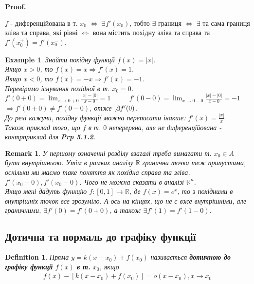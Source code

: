 \documentclass[a4paper, 14pt]{article}
\makeatletter
\def\qed{$\blacksquare$}
\theoremstyle{theoremdd}
\theoremstyle{theoremdd}
\newtheorem{definition}[theorem]{Definition}
\theoremstyle{theoremdd}
\theoremstyle{theoremdd}
\newtheorem{example}[theorem]{Example}
\theoremstyle{theoremdd}
\theoremstyle{theoremdd}
\newtheorem{remark}[theorem]{Remark}
\theoremstyle{theoremdd}
\theoremstyle{theoremdd}
\renewenvironment{proof}[1][Proof.\\]{\par
\pushQED{\hfill \qed}%
\normalfont \topsep6\p@\@plus6\p@\relax
\trivlist
\item\relax
{\bfseries
#1\@addpunct{.}}\hspace\labelsep\ignorespaces
}{%
\popQED\endtrivlist\@endpefalse
}
\makeatother
\begin{document}
\begin{proof}
$f$ - диференційована в т. $x_0$ $\iff$ $\exists f'(x_0)$, тобто $\exists$ границя $\iff$ $\exists$ та сама границя зліва та справа, які рівні $\iff$ вона містить похідну зліва та справа та $f'(x_0^+) = f'(x_0^-)$.
\end{proof}

\begin{example}
Знайти похідну функції $f(x) = |x|$.\\
Якщо $x>0$, то $f(x) = x \Rightarrow f'(x) = 1$.\\
Якщо $x<0$, то $f(x) = -x \Rightarrow f'(x) = -1$.\\
Перевіримо існування похідної в т. $x_0 = 0$.\\
$f'(0+0) = \displaystyle \lim_{x \to 0+0} \frac{|x|-|0|}{x-0} = 1 \hspace{1cm}$
$f'(0-0) = \displaystyle \lim_{x \to 0-0} \frac{|x|-|0|}{x-0} = -1$\\
$\Rightarrow f'(0+0) \neq f'(0-0)$, отже $\not \exists f'(0)$. \\ До речі кажучи, похідну функції можна переписати інакше: $f'(x) = \displaystyle \frac{|x|}{x}$.\\
Також приклад того, що $f$ в т. $0$ неперервна, але не диференційована - контрприклад для \textbf{Prp 5.1.2}.
\end{example}

\begin{remark}
У першому означенні розділу взагалі треба вимагати т. $x_0 \in A$ бути внутрішньою. Утім в рамках аналізу $\mathbb{R}$ гранична точка теж припустима, оскільки ми маємо таке поняття як похідна справа та зліва, $f'(x_0+0),f'(x_0-0)$. Чого не можна сказати в аналізі $\mathbb{R}^n$.\\
Якщо мені дадуть функцію $f: [0,1] \to \mathbb{R}$, де $f(x) = e^x$, то з похідними в внутрішніх точок все зрозуміло. А ось на кінцях, що не є вже внутрішніми, але граничними, $\exists f'(0) = f'(0+0)$, а також $\exists f'(1) = f'(1-0)$.
\end{remark}

\subsection{Дотична та нормаль до графіку функції}
\begin{definition}
Пряма $y = k (x-x_0) + f(x_0)$ називається \textbf{дотичною до графіку функції} $f(x)$ \textbf{в т.} $x_0$, якщо
\begin{align*}
f(x) - [k(x-x_0)+f(x_0)] = o(x-x_0), x\to x_0
\end{align*}
\end{definition}
\end{document}
